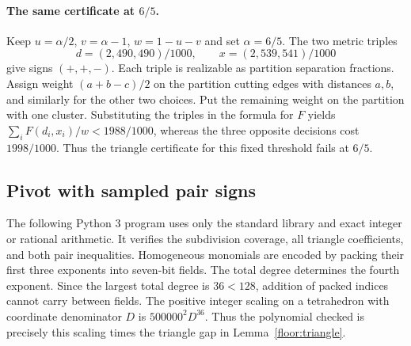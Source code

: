 \documentclass[11pt]{article}
\begin{document}
\paragraph{The same certificate at $6/5$.}
Keep $u=\alpha/2$, $v=\alpha-1$, $w=1-u-v$ and set $\alpha=6/5$.
The two metric triples
\[
  d=(2,490,490)/1000,\qquad x=(2,539,541)/1000
\]
give signs $(+,+,-)$. Each triple is realizable as partition separation
fractions. Assign weight $(a+b-c)/2$ on the partition cutting
edges with distances $a,b$, and similarly for the other two choices.
Put the remaining weight on the partition with one cluster.
Substituting the triples in the formula for $F$ yields
$\sum_i F(d_i,x_i)/w<1988/1000$, whereas the three opposite
decisions cost $1998/1000$. Thus the triangle certificate for this
fixed threshold fails at $6/5$.

\subsection{Pivot with sampled pair signs}\label{floor:verifier}
The following Python 3 program uses only the standard library and
exact integer or rational arithmetic.  It verifies the subdivision
coverage, all triangle coefficients, and both pair inequalities.
Homogeneous monomials are encoded by packing their first three
exponents into seven-bit fields. The total degree determines
the fourth exponent.  Since the largest total degree is $36<128$,
addition of packed indices cannot carry between fields.  The positive
integer scaling on a tetrahedron with coordinate denominator $D$ is
$500000^2D^{36}$.  Thus the polynomial checked is precisely this
scaling times the triangle gap in Lemma~\ref{floor:triangle}.
\end{document}
